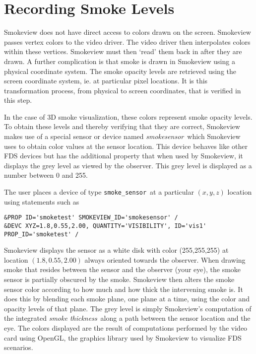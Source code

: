 \documentclass[11pt,twoside]{book}
\begin{document}
\section{Recording Smoke Levels}
\label{sect:record_smoke}

Smokeview does not have direct access to colors drawn on the screen.
Smokeview passes vertex colors to the video driver.
The video driver then interpolates colors within these vertices.
Smokeview must then `read' them back in after they are drawn.
A further complication is that smoke is drawn in Smokeview using a physical coordinate system.
The smoke opacity levels are retrieved using the screen coordinate system, ie.
at particular pixel locations.
It is this transformation process, from physical to screen coordinates,
that is verified in this step.

In the case of 3D smoke visualization, these colors represent smoke opacity levels.
To obtain these levels and thereby verifying that they are correct,
Smokeview makes use of a special sensor or device named {\em smokesensor}\
which Smokeview uses to obtain color values at the sensor location.
This device behaves like other FDS devices but has the additional
property that when used by Smokeview, it displays the grey level as viewed by the observer.
This grey level is displayed as a number between 0 and 255.

The user places a device of type {\tt smoke\_sensor}\ at a particular $(x, y, z)$ location using statements such as

{\small
\begin{verbatim}
&PROP ID='smoketest' SMOKEVIEW_ID='smokesensor' /
&DEVC XYZ=1.8,0.55,2.00, QUANTITY='VISIBILITY', ID='vis1' PROP_ID='smoketest' /
\end{verbatim}
}

Smokeview displays the sensor as a white disk with color (255,255,255) at location $(1.8,0.55,2.00)$
always oriented towards the observer. When drawing smoke that resides between
the sensor and the observer (your eye), the smoke sensor is partially obscured by the smoke.
Smokeview then alters the smoke sensor color according to how much and how thick the
intervening smoke is.  It does this by blending each smoke plane, one plane at a time, using
the color and opacity levels of that plane. The grey level is simply Smokeview's
computation of the integrated {\em smoke thickness}\ along a path between the sensor
location and the eye.  The colors displayed are the result of computations performed by the
video card using OpenGL, the graphics library used by Smokeview to visualize FDS scenarios.
\end{document}
